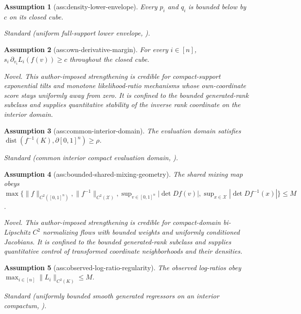 \documentclass{article}
\newtheorem{assumption}{Assumption}
\begin{document}
\begin{assumption}[ass:density-lower-envelope]\label{ass:density-lower-envelope}
Every \(p_i\) and \(q_i\) is bounded below by \(c\) on its closed cube.
\par\smallskip\noindent\emph{Standard} (uniform full-support lower envelope, \cite{Xie2023UniformConditionalCDF}).
\end{assumption}

\begin{assumption}[ass:own-derivative-margin]\label{ass:own-derivative-margin}
For every \(i\in[n]\), \(s_i\,\partial_{v_i}L_i(f(v))\ge c\) throughout the closed cube.
\par\smallskip\noindent\emph{Novel.} This author-imposed strengthening is credible for compact-support exponential tilts and monotone likelihood-ratio mechanisms whose own-coordinate score stays uniformly away from zero. It is confined to the bounded generated-rank subclass and supplies quantitative stability of the inverse rank coordinate on the interior domain.
\end{assumption}

\begin{assumption}[ass:common-interior-domain]\label{ass:common-interior-domain}
The evaluation domain satisfies \(\operatorname{dist}(f^{-1}(K),\partial[0,1]^n)\ge\rho\).
\par\smallskip\noindent\emph{Standard} (common interior compact evaluation domain, \cite{Xie2023UniformConditionalCDF}).
\end{assumption}

\begin{assumption}[ass:bounded-shared-mixing-geometry]\label{ass:bounded-shared-mixing-geometry}
The shared mixing map obeys \(\max\{\|f\|_{C^2([0,1]^n)},\|f^{-1}\|_{C^2(\mathcal X)},\sup_{v\in[0,1]^n}|\det Df(v)|,\sup_{x\in\mathcal X}|\det Df^{-1}(x)|\}\le M\).
\par\smallskip\noindent\emph{Novel.} This author-imposed strengthening is credible for compact-domain bi-Lipschitz \(C^2\) normalizing flows with bounded weights and uniformly conditioned Jacobians. It is confined to the bounded generated-rank subclass and supplies quantitative control of transformed coordinate neighborhoods and their densities.
\end{assumption}

\begin{assumption}[ass:observed-log-ratio-regularity]\label{ass:observed-log-ratio-regularity}
The observed log-ratios obey \(\max_{i\in[n]}\|L_i\|_{C^2(K)}\le M\).
\par\smallskip\noindent\emph{Standard} (uniformly bounded smooth generated regressors on an interior compactum, \cite{MammenRotheSchienle2012GeneratedCovariates}).
\end{assumption}
\end{document}
